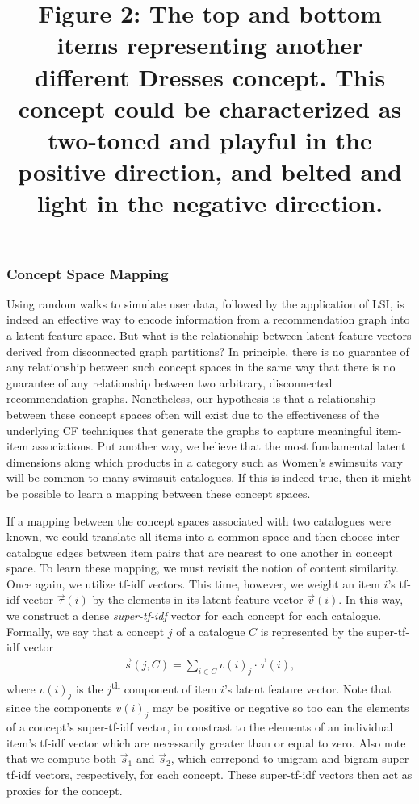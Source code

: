 \documentclass[11pt]{article}
\begin{document}
\begin{figure}
\begin{subfigure}{.18\textwidth}
\label{fig:sub2}
\end{subfigure}
\title{Figure 2: The top and bottom items representing another different Dresses
concept. This concept could be characterized as two-toned and playful in the
positive direction, and belted and light in the negative direction.}
\label{fig:conceptB} \end{figure}

\subsubsection*{Concept Space Mapping}
Using random walks to simulate user data, followed by the application of LSI, is
indeed an effective way to encode information from a recommendation graph into a
latent feature space. But what is the relationship between latent feature
vectors derived from disconnected graph partitions? In principle, there is no
guarantee of any relationship between such concept spaces in the same way that
there is no guarantee of any relationship between two arbitrary, disconnected
recommendation graphs. Nonetheless, our hypothesis is that a relationship
between these concept spaces often will exist due to the effectiveness of the
underlying CF techniques that generate the graphs to capture meaningful
item-item associations. Put another way, we believe that the most fundamental
latent dimensions along which products in a category such as Women's swimsuits
vary will be common to many swimsuit catalogues. If this is indeed true, then it
might be possible to learn a mapping between these concept spaces.

If a mapping between the concept spaces associated with two catalogues were
known, we could translate all items into a common space and then choose
inter-catalogue edges between item pairs that are nearest to one another in
concept space. To learn these mapping, we must revisit the notion of content
similarity. Once again, we utilize tf-idf vectors. This time, however, we weight
an item $i$'s tf-idf vector $\vec{\tau}(i)$ by the elements in its latent
feature vector $\vec{v}(i)$. In this way, we construct a dense {\em
super-tf-idf} vector for each concept for each catalogue. Formally, we say that
a concept $j$ of a catalogue $C$ is represented by the super-tf-idf vector
\begin{align}
\vec{s}(j,C) = \sum_{i \in C}{v(i)_j \cdot \vec{\tau}(i)},
\end{align}
where $v(i)_j$ is the $j$\textsuperscript{th} component of item $i$'s latent
feature vector. Note that since the components $v(i)_j$ may be positive or
negative so too can the elements of a concept's super-tf-idf vector, in
constrast to the elements of an individual item's tf-idf vector which are
necessarily greater than or equal to zero. Also note that we compute both
$\vec{s}_1$ and $\vec{s}_2$, which correpond to unigram and bigram super-tf-idf
vectors, respectively, for each concept. These super-tf-idf vectors then act as
proxies for the concept.
\end{document}
